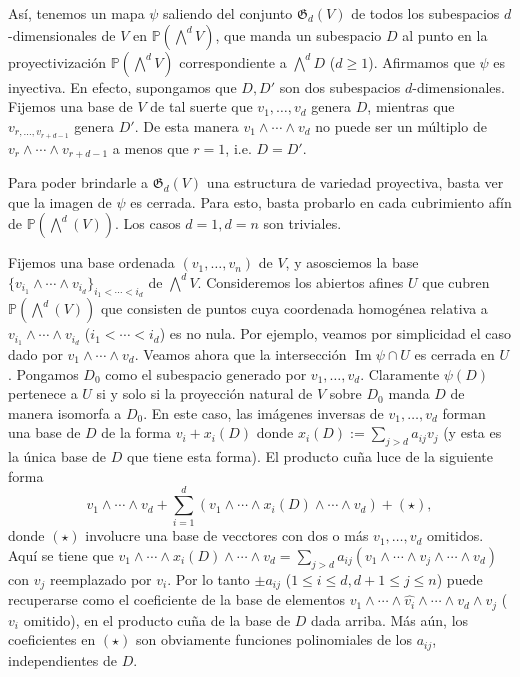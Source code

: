 \documentclass[spanish,10pt]{amsart}
\theoremstyle{definition}
\theoremstyle{remark}
\numberwithin{equation}{section}
\newcommand{\Imagen}{\operatorname{Im}}
\renewcommand{\hat}[1]{\widehat{#1}}
\begin{document}
Así, tenemos un mapa $\psi$ saliendo del conjunto $\mathfrak G_d (V)$ de todos los subespacios $d$-dimensionales de $V$ en $\mathbb{P} (\bigwedge^d V)$, que manda un subespacio $D$ al punto en la proyectivización $\mathbb{P} (\bigwedge^d V)$ correspondiente a $\bigwedge^d D$ ($d \geq 1$). Afirmamos que $\psi$ es inyectiva. En efecto, supongamos que $D,D'$ son dos subespacios $d$-dimensionales. Fijemos una base de $V$ de tal suerte que $v_1, \ldots, v_d$ genera $D$, mientras que $v_{r, \ldots, v_{r + d - 1}}$ genera $D'$. De esta manera $v_1 \wedge \cdots \wedge v_d$ no puede ser un múltiplo de $v_r \wedge \cdots \wedge v_{r+d - 1}$ a menos que $r = 1$, i.e. $D = D'$.

Para poder brindarle a $\mathfrak G _d (V)$ una estructura de variedad proyectiva, basta ver que la imagen de $\psi$ es cerrada. Para esto, basta probarlo en cada cubrimiento afín de $\mathbb{P}(\bigwedge^d (V))$. Los casos $d = 1, d = n$ son triviales.

Fijemos una base ordenada $(v_1, \ldots, v_n)$ de $V$, y asosciemos la base $\{v_{i_1} \wedge \cdots \wedge v_{i_d}\}_{i_1 < \cdots < i_d}$ de $\bigwedge^d V$. Consideremos los abiertos afines $U$ que cubren $\mathbb{P} (\bigwedge^d (V))$ que consisten de puntos cuya coordenada homogénea relativa a $v_{i_1} \wedge \cdots \wedge v_{i_d}$ ($i_1 < \cdots < i_d$) es no nula. Por ejemplo, veamos por simplicidad el caso dado por $v_1 \wedge \cdots \wedge v_d$. Veamos ahora que la intersección $\Imagen \psi \cap U$ es cerrada en $U$. Pongamos $D_0$ como el subespacio generado por $v_1, \ldots, v_d$. Claramente $\psi (D)$ pertenece a $U$ si y solo si la proyección natural de $V$ sobre $D_0$ manda $D$ de manera isomorfa a $D_0$. En este caso, las imágenes inversas de $v_1, \ldots, v_d$ forman una base de $D$ de la forma $v_i + x_i (D)$ donde $x_i (D) := \sum_{j > d} a_{ij} v_j$ (y esta es la única base de $D$ que tiene esta forma). El producto cuña luce de la siguiente forma
\[
    v_1 \wedge \cdots \wedge v_d + \sum_{i = 1}^d (v_1 \wedge \cdots \wedge x_i (D) \wedge \cdots \wedge v_d) + (\star),
\]
donde $(\star)$ involucre una base de vecctores con dos o más $v_1, \ldots, v_d$ omitidos. Aquí se tiene que $v_1 \wedge \cdots \wedge x_i (D) \wedge \cdots \wedge v_d = \sum_{j > d} a_{ij} (v_1 \wedge \cdots \wedge v_j \wedge \cdots \wedge v_d)$ con $v_j$ reemplazado por $v_i$. Por lo tanto $\pm a_{ij}$ ($ 1 \leq i \leq d, d + 1 \leq j \leq n$) puede recuperarse como el coeficiente de la base de elementos $v_1 \wedge \cdots \wedge \hat {v_i} \wedge \cdots \wedge v_d \wedge v_j$ ($v_i$ omitido), en el producto cuña de la base de $D$ dada arriba. Más aún, los coeficientes en $(\star)$ son obviamente funciones polinomiales de los $a_{ij}$, independientes de $D$.
\end{document}
